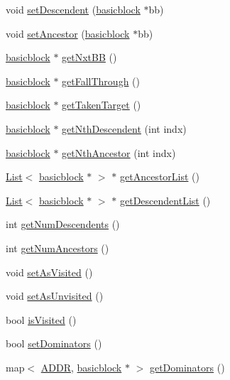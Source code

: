 \begin{DoxyCompactItemize}
\item 
void \hyperlink{classbasicblock_aaede95419f42104aca674399aeef1a9b}{setDescendent} (\hyperlink{classbasicblock}{basicblock} $\ast$bb)
\item 
void \hyperlink{classbasicblock_a731087012c909b6d3875fa6fb5731bab}{setAncestor} (\hyperlink{classbasicblock}{basicblock} $\ast$bb)
\item 
\hyperlink{classbasicblock}{basicblock} $\ast$ \hyperlink{classbasicblock_aae1b2e9429abfe8474fb5f1bc5a204b2}{getNxtBB} ()
\item 
\hyperlink{classbasicblock}{basicblock} $\ast$ \hyperlink{classbasicblock_a8024f7c124db80125950b2582ee28e81}{getFallThrough} ()
\item 
\hyperlink{classbasicblock}{basicblock} $\ast$ \hyperlink{classbasicblock_a4be1cedc2d2596df89d3b9f118c0e445}{getTakenTarget} ()
\item 
\hyperlink{classbasicblock}{basicblock} $\ast$ \hyperlink{classbasicblock_a571a65129ed999a167803d516cb9455e}{getNthDescendent} (int indx)
\item 
\hyperlink{classbasicblock}{basicblock} $\ast$ \hyperlink{classbasicblock_a24ef17acb451da40eb9ecca3a05c9fb3}{getNthAncestor} (int indx)
\item 
\hyperlink{classList}{List}$<$ \hyperlink{classbasicblock}{basicblock} $\ast$ $>$ $\ast$ \hyperlink{classbasicblock_a006ea6066123e6c2a0ba76784dfcee1c}{getAncestorList} ()
\item 
\hyperlink{classList}{List}$<$ \hyperlink{classbasicblock}{basicblock} $\ast$ $>$ $\ast$ \hyperlink{classbasicblock_afac9781fe5c67f0d3f983d60e468dc8d}{getDescendentList} ()
\item 
int \hyperlink{classbasicblock_a42700afdf9102a0f287690f4f8c487f9}{getNumDescendents} ()
\item 
int \hyperlink{classbasicblock_af95ff01c9b4eb7a12cd58558771c92b2}{getNumAncestors} ()
\item 
void \hyperlink{classbasicblock_adb3d7c691e7974f77619409fe4a24335}{setAsVisited} ()
\item 
void \hyperlink{classbasicblock_a810b34c12cbddff700700341734ddc5d}{setAsUnvisited} ()
\item 
bool \hyperlink{classbasicblock_ad40cc70b314779ab7d0990813d3053d4}{isVisited} ()
\item 
bool \hyperlink{classbasicblock_aae21234b7ccd801b037a3a26a11d44e7}{setDominators} ()
\item 
map$<$ \hyperlink{binaryTranslator_2global_8h_aa4557b0650cb21e57e3e4623410832c6}{ADDR}, \hyperlink{classbasicblock}{basicblock} $\ast$ $>$ \hyperlink{classbasicblock_aec14cf5254976daec791c62e1b684ecf}{getDominators} ()

\end{DoxyCompactItemize}
